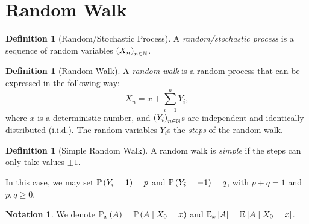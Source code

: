 \documentclass{article}
\theoremstyle{definition}
\newtheorem{definition}[theorem]{Definition}
\newtheorem{notation}[theorem]{Notation}
\theoremstyle{remark}
\newcommand{\NN}{\mathbb{N}}
\newcommand{\Prob}{\mathbb{P}}
\newcommand{\Expt}{\mathbb{E}}
\newcommand{\Conditional}[2]{#1\mid #2}
\begin{document}
\section{Random Walk}

\begin{definition}[Random/Stochastic Process]
    \label{def:random-stochastic-process}%
    A \emph{random/stochastic process} is a sequence of random variables \(\pqty{X_n}_{n \in \NN}\).
\end{definition}

\begin{definition}[Random Walk]
    \label{def:random-walk}%
    A \emph{random walk} is a random process that can be expressed in the following way:
    \[
        X_n = x + \sum_{i = 1}^{n} Y_i,
    \]
    where \(x\) is a deterministic number, and \(\pqty{Y_i}_{n \in \NN}\)s are independent and identically distributed (i.i.d.). The random variables \(Y_i\)s the \emph{steps} of the random walk.
\end{definition}

\begin{definition}[Simple Random Walk]
    \label{def:simple-random-walk}%
    A random walk is \emph{simple} if the steps can only take values \(\pm 1\).
\end{definition}

In this case, we may set \(\Prob\pqty{Y_i = 1} = p\) and \(\Prob\pqty{Y_i = -1} = q\), with \(p + q = 1\) and \(p, q \geq 0\).

\begin{notation}
    We denote \(\Prob_x\pqty{A} = \Prob\pqty{\Conditional{A}{X_0 = x}}\) and \(\Expt_x\bqty{A} = \Expt\bqty{\Conditional{A}{X_0 = x}}\).
\end{notation}
\end{document}
